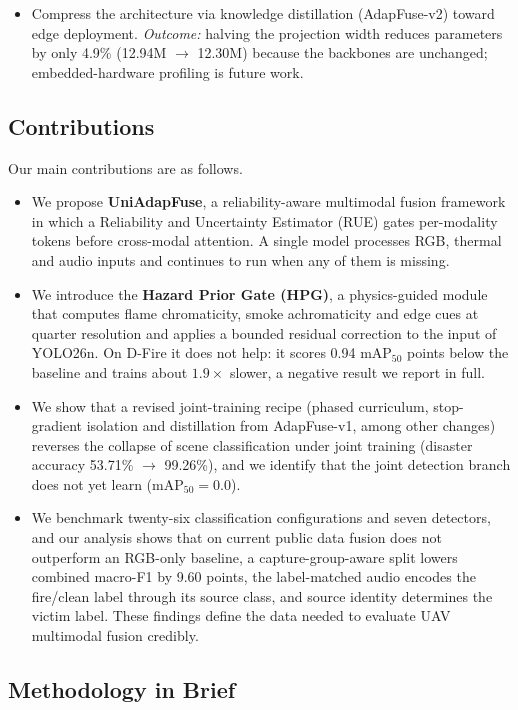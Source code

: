 \documentclass[journal]{IEEEtran}
\begin{document}
\begin{itemize}
    \item Compress the architecture via knowledge distillation (AdapFuse-v2) toward edge deployment. \textit{Outcome:} halving the projection width reduces parameters by only 4.9\% (12.94M $\to$ 12.30M) because the backbones are unchanged; embedded-hardware profiling is future work.
\end{itemize}

\subsection{Contributions}

Our main contributions are as follows.

\begin{itemize}
    \item We propose \textbf{UniAdapFuse}, a reliability-aware multimodal fusion framework in which a Reliability and Uncertainty Estimator (RUE) gates per-modality tokens before cross-modal attention. A single model processes RGB, thermal and audio inputs and continues to run when any of them is missing.
    \item We introduce the \textbf{Hazard Prior Gate (HPG)}, a physics-guided module that computes flame chromaticity, smoke achromaticity and edge cues at quarter resolution and applies a bounded residual correction to the input of YOLO26n. On D-Fire it does not help: it scores 0.94 $\mathrm{mAP}_{50}$ points below the baseline and trains about $1.9\times$ slower, a negative result we report in full.
    \item We show that a revised joint-training recipe (phased curriculum, stop-gradient isolation and distillation from AdapFuse-v1, among other changes) reverses the collapse of scene classification under joint training (disaster accuracy 53.71\% $\to$ 99.26\%), and we identify that the joint detection branch does not yet learn ($\mathrm{mAP}_{50}=0.0$).
    \item We benchmark twenty-six classification configurations and seven detectors, and our analysis shows that on current public data fusion does not outperform an RGB-only baseline, a capture-group-aware split lowers combined macro-F1 by 9.60 points, the label-matched audio encodes the fire/clean label through its source class, and source identity determines the victim label. These findings define the data needed to evaluate UAV multimodal fusion credibly.
\end{itemize}

\subsection{Methodology in Brief}
\end{document}
